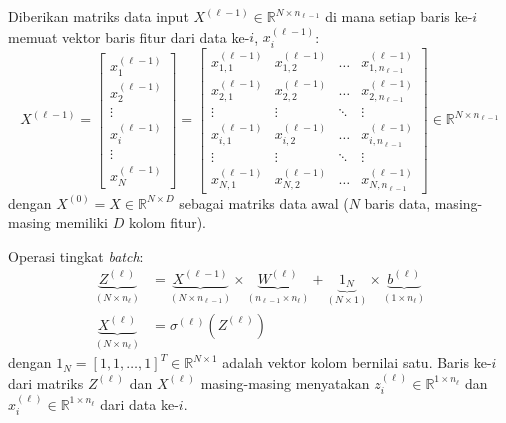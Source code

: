 \documentclass[11pt,a4paper]{article}
\def\mathbf#1{#1}%
\theoremstyle{plain}
\theoremstyle{definition}
\theoremstyle{remark}
\begin{document}
Diberikan matriks data input $X^{(\ell-1)} \in \mathbb{R}^{N \times n_{\ell-1}}$ di mana setiap baris ke-$i$ memuat vektor baris fitur dari data ke-$i$, $\mathbf{x}^{(\ell-1)}_i$:
\begin{equation}
    X^{(\ell-1)} = \begin{bmatrix}
        \mathbf{x}^{(\ell-1)}_1 \\
        \mathbf{x}^{(\ell-1)}_2 \\
        \vdots \\
        \mathbf{x}^{(\ell-1)}_i \\
        \vdots \\
        \mathbf{x}^{(\ell-1)}_N
    \end{bmatrix} = \begin{bmatrix}
        x^{(\ell-1)}_{1, 1} & x^{(\ell-1)}_{1, 2} & \dots & x^{(\ell-1)}_{1, n_{\ell-1}} \\
        x^{(\ell-1)}_{2, 1} & x^{(\ell-1)}_{2, 2} & \dots & x^{(\ell-1)}_{2, n_{\ell-1}} \\
        \vdots & \vdots & \ddots & \vdots \\
        x^{(\ell-1)}_{i, 1} & x^{(\ell-1)}_{i, 2} & \dots & x^{(\ell-1)}_{i, n_{\ell-1}} \\
        \vdots & \vdots & \ddots & \vdots \\
        x^{(\ell-1)}_{N, 1} & x^{(\ell-1)}_{N, 2} & \dots & x^{(\ell-1)}_{N, n_{\ell-1}}
    \end{bmatrix} \in \mathbb{R}^{N \times n_{\ell-1}} \label{eq:matrix_batch_X}
\end{equation}
dengan $X^{(0)} = X \in \mathbb{R}^{N \times D}$ sebagai matriks data awal ($N$ baris data, masing-masing memiliki $D$ kolom fitur).

Operasi tingkat \textit{batch}:
\begin{align}
    \underbrace{Z^{(\ell)}}_{(N \times n_\ell)} &= \underbrace{X^{(\ell-1)}}_{(N \times n_{\ell-1})} \times \underbrace{W^{(\ell)}}_{(n_{\ell-1} \times n_\ell)} + \underbrace{\mathbf{1}_N}_{(N \times 1)} \times \underbrace{\mathbf{b}^{(\ell)}}_{(1 \times n_\ell)} \label{eq:batch_row_z} \\
    \underbrace{X^{(\ell)}}_{(N \times n_\ell)} &= \sigma^{(\ell)}\left( Z^{(\ell)} \right) \label{eq:batch_row_x}
\end{align}
dengan $\mathbf{1}_N = [1, 1, \dots, 1]^T \in \mathbb{R}^{N \times 1}$ adalah vektor kolom bernilai satu. Baris ke-$i$ dari matriks $Z^{(\ell)}$ dan $X^{(\ell)}$ masing-masing menyatakan $\mathbf{z}^{(\ell)}_i \in \mathbb{R}^{1 \times n_\ell}$ dan $\mathbf{x}^{(\ell)}_i \in \mathbb{R}^{1 \times n_\ell}$ dari data ke-$i$.
\end{document}
